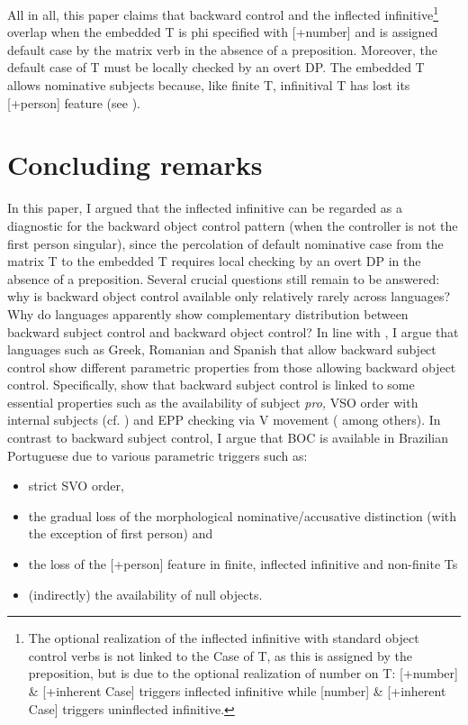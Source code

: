 \documentclass[output=paper]{langsci/langscibook}
\begin{document}
All in all, this paper claims that backward control and the inflected infinitive\footnote{The optional realization of the inflected infinitive with standard object control verbs is not linked to the Case of T, as this is assigned by the preposition, but is due to the optional realization of number on T: [+number] \& [+inherent Case]  triggers inflected infinitive while [\textminus number] \& [+inherent Case] triggers uninflected infinitive.} overlap when the embedded T is phi specified with [+number] and is assigned default case by the matrix verb in the absence of a preposition. Moreover, the default case of T must be locally checked by an overt DP. The embedded T allows nominative subjects because, like finite T, infinitival T has lost its [+person] feature (see \citealt{Cyrino2010}).

\section{Concluding remarks}%

In this paper, I argued that the inflected infinitive can be regarded as a diagnostic for the backward object control pattern (when the controller is not the first person singular), since the percolation of default nominative case from the matrix T to the embedded T requires local checking by an overt DP in the absence of a preposition. Several crucial questions still remain to be answered: why is backward object control available only relatively rarely across languages? Why do languages apparently show complementary distribution between backward subject control and backward object control? In line with \citet{AlexiadouEtAl2010}, I argue that languages such as Greek, Romanian and Spanish that allow backward subject control show different parametric properties from those allowing backward object control. Specifically, \citet{AlexiadouEtAl2010} show that backward subject control is linked to some essential properties such as the availability of subject \textit{pro,} VSO order with internal subjects (cf. \citealt{Alexiadou2001}) and EPP checking via V movement (\citealt{Alexiadou1998} among others). In contrast to backward subject control, I argue that BOC is available in Brazilian Portuguese due to various parametric triggers such as:

\begin{itemize}
\item strict SVO order, 
\item the gradual loss of the morphological nominative/accusative distinction (with the exception of first person) and 
\item the loss of the [+person] feature in finite, inflected infinitive and non-finite Ts
\item (indirectly) the availability of null objects. 
\end{itemize}
\end{document}
